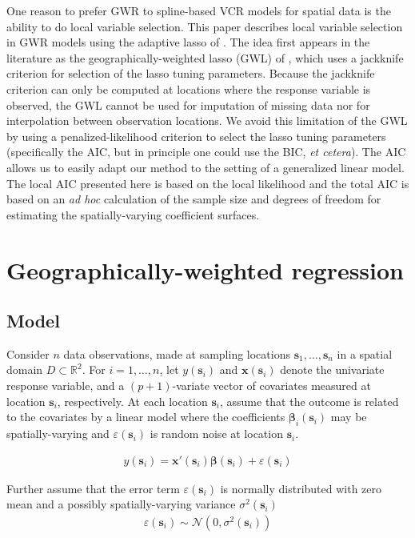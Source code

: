\documentclass[authoryear, review, 11pt]{elsarticle}
\begin{document}
	One reason to prefer GWR to spline-based VCR models for spatial data is the ability to do local variable selection. This paper describes local variable selection in GWR models using the adaptive lasso of \cite{Zou:2006}. The idea first appears in the literature as the geographically-weighted lasso (GWL) of \cite{Wheeler:2009}, which uses a jackknife criterion for selection of the lasso tuning parameters. Because the jackknife criterion can only be computed at locations where the response variable is observed, the GWL cannot be used for imputation of missing data nor for interpolation between observation locations. We avoid this limitation of the GWL by using a penalized-likelihood criterion to select the lasso tuning parameters (specifically the AIC, but in principle one could use the BIC, \emph{et cetera}). The AIC allows us to easily adapt our method to the setting of a generalized linear model. The local AIC presented here is based on the local likelihood \citep{Loader:1999} and the total AIC is based on an \emph{ad hoc} calculation of the sample size and degrees of freedom for estimating the spatially-varying coefficient surfaces.
	
\section{Geographically-weighted regression \label{section:GWR}}

	\subsection{Model}
	Consider $n$ data observations, made at sampling locations $\bm{s}_1, \dots, \bm{s}_n$ in a spatial domain $D \subset \mathbb{R}^2$. For $i = 1, \dots, n$, let $y(\bm{s}_i)$ and $\bm{x}(\bm{s}_i)$ denote the univariate response variable, and a $(p+1)$-variate vector of covariates measured at location $\bm{s}_i$, respectively. At each location $\bm{s}_i$, assume that the outcome is related to the covariates by a linear model where the coefficients $\bm{\beta}_i(\bm{s}_i)$ may be spatially-varying and $\varepsilon(\bm{s}_i)$ is random noise at location $\bm{s}_i$.

	\begin{eqnarray}
		y(\bm{s}_i) = \bm{x}'(\bm{s}_i) \bm{\beta}(\bm{s}_i) + \varepsilon(\bm{s}_i)
	\label{eq:lm(s)}
	\end{eqnarray}
	
	Further assume that the error term $\varepsilon(\bm{s}_i)$ is normally distributed with zero mean and a possibly spatially-varying variance $\sigma^2(\bm{s}_i)$
	\begin{eqnarray}
		\varepsilon(\bm{s}_i) \sim \mathcal{N} \left( 0,\sigma^2(\bm{s}_i) \right)
	\label{eq:err}
	\end{eqnarray}
	
\end{document}
